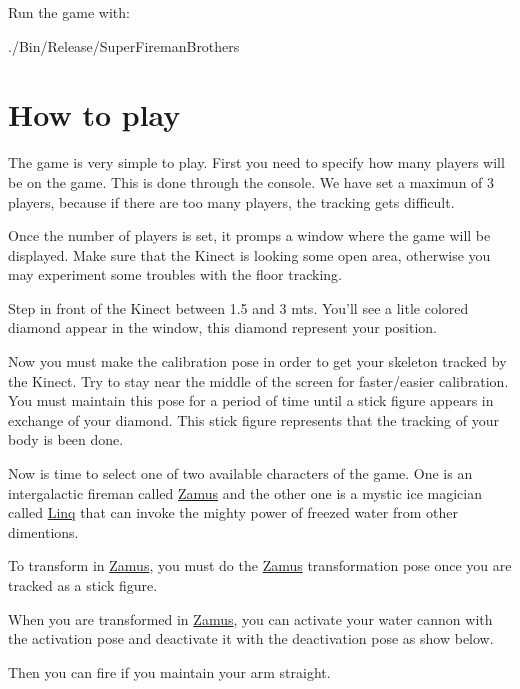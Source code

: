 Run the game with:


\begin{DoxyItemize}
\item ./Bin/Release/SuperFiremanBrothers
\end{DoxyItemize}



\hypertarget{index_playmode}{}\section{How to play}\label{index_playmode}
The game is very simple to play. First you need to specify how many players will be on the game. This is done through the console. We have set a maximun of 3 players, because if there are too many players, the tracking gets difficult.

Once the number of players is set, it promps a window where the game will be displayed. Make sure that the Kinect is looking some open area, otherwise you may experiment some troubles with the floor tracking.

Step in front of the Kinect between 1.5 and 3 mts. You'll see a litle colored diamond appear in the window, this diamond represent your position.



Now you must make the calibration pose in order to get your skeleton tracked by the Kinect. Try to stay near the middle of the screen for faster/easier calibration. You must maintain this pose for a period of time until a stick figure appears in exchange of your diamond. This stick figure represents that the tracking of your body is been done.

Now is time to select one of two available characters of the game. One is an intergalactic fireman called \hyperlink{classZamus}{Zamus} and the other one is a mystic ice magician called \hyperlink{classLinq}{Linq} that can invoke the mighty power of freezed water from other dimentions.

To transform in \hyperlink{classZamus}{Zamus}, you must do the \hyperlink{classZamus}{Zamus} transformation pose once you are tracked as a stick figure.

 

When you are transformed in \hyperlink{classZamus}{Zamus}, you can activate your water cannon with the activation pose and deactivate it with the deactivation pose as show below.

 

Then you can fire if you maintain your arm straight.



